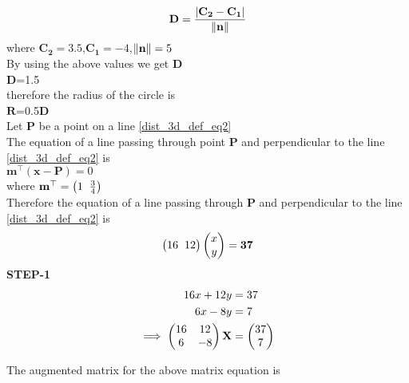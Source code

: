 \documentclass[journal,12pt,twocolumn]{IEEEtran}
\let\vec\mathbf
\begin{document}
\begin{tableofcontents}
\begin{align}
	\vec{D}=\frac{|\vec{C_2}-\vec{C_1}|}{\vec{\norm{n}}}
\end{align}
where $\vec{C_2}=3.5$,$\vec{C_1}=-4$,$\vec{\norm{n}}=5$\\
By using the above values we get $\vec D$\\
$\vec D$=1.5\\
therefore the radius of the circle is\\
$\vec R$=0.5${\vec D}$\\
Let $\vec P$ be a point on a line \eqref{dist_3d_def_eq2} \\
The equation of a line passing through point $\vec P$ and perpendicular to the line \eqref{dist_3d_def_eq2} is\\
$\vec{m}^{\top}(\vec{x}-\vec{P})=0$\\
where $\vec{m}^{\top}=\myvec{1\hspace{2mm}\frac{3}{4}}$ \\
Therefore the equation of a line passing through $\vec P$ and perpendicular to the line \eqref{dist_3d_def_eq2} is \\
\begin{align}
\label{dist_3d_def_eq5}
\myvec{16\hspace{2mm}12}\myvec{x \\ y}=\vec{37}
\end{align}
\textbf{STEP-1}\vspace{2mm}\\
 \begin{align}
       16x +12y &= 37
       \\
       6x -8y  &= 7
       \\
       \implies 
       \myvec{16 &  12
       \\
       6 & -8}\vec{X} &= \myvec{37 \\ 7}
      \end{align}
      
      The augmented matrix for the above matrix equation is 
     

\end{tableofcontents}
\end{document}
